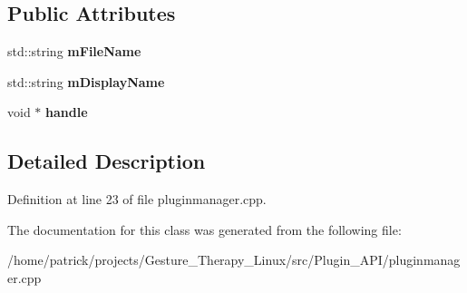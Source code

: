 \subsection*{Public Attributes}
\begin{DoxyCompactItemize}
\item 
\mbox{\label{class_plugin_instance_1_1_impl_a8bc5c813f43b69836978cca9bdd9ac5d}} 
std\+::string {\bfseries m\+File\+Name}
\item 
\mbox{\label{class_plugin_instance_1_1_impl_a834bb1cd6c65432f8e2764f2f922dc89}} 
std\+::string {\bfseries m\+Display\+Name}
\item 
\mbox{\label{class_plugin_instance_1_1_impl_aff0dafb151cc128f05914b2838a8fa1f}} 
void $\ast$ {\bfseries handle}
\end{DoxyCompactItemize}


\subsection{Detailed Description}


Definition at line 23 of file pluginmanager.\+cpp.



The documentation for this class was generated from the following file\+:\begin{DoxyCompactItemize}
\item 
/home/patrick/projects/\+Gesture\+\_\+\+Therapy\+\_\+\+Linux/src/\+Plugin\+\_\+\+A\+P\+I/pluginmanager.\+cpp\end{DoxyCompactItemize}
